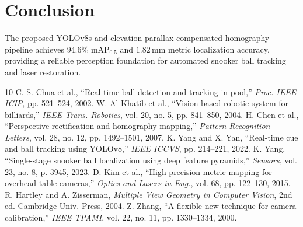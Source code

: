 \documentclass[conference]{IEEEtran}
\begin{document}
\section{Conclusion}
The proposed YOLOv8s and elevation-parallax-compensated homography pipeline achieves $94.6\%$ $\text{mAP}_{0.5}$ and $1.82\,\text{mm}$ metric localization accuracy, providing a reliable perception foundation for automated snooker ball tracking and laser restoration.


\begin{thebibliography}{10}
 C. S. Chua et al., ``Real-time ball detection and tracking in pool,'' \textit{Proc. IEEE ICIP}, pp. 521--524, 2002.
 W. Al-Khatib et al., ``Vision-based robotic system for billiards,'' \textit{IEEE Trans. Robotics}, vol. 20, no. 5, pp. 841--850, 2004.
 H. Chen et al., ``Perspective rectification and homography mapping,'' \textit{Pattern Recognition Letters}, vol. 28, no. 12, pp. 1492--1501, 2007.
 K. Yang and X. Yan, ``Real-time cue and ball tracking using YOLOv8,'' \textit{IEEE ICCVS}, pp. 214--221, 2022.
 K. Yang, ``Single-stage snooker ball localization using deep feature pyramids,'' \textit{Sensors}, vol. 23, no. 8, p. 3945, 2023.
 D. Kim et al., ``High-precision metric mapping for overhead table cameras,'' \textit{Optics and Lasers in Eng.}, vol. 68, pp. 122--130, 2015.
 R. Hartley and A. Zisserman, \textit{Multiple View Geometry in Computer Vision}, 2nd ed. Cambridge Univ. Press, 2004.
 Z. Zhang, ``A flexible new technique for camera calibration,'' \textit{IEEE TPAMI}, vol. 22, no. 11, pp. 1330--1334, 2000.
\end{thebibliography}
\end{document}
